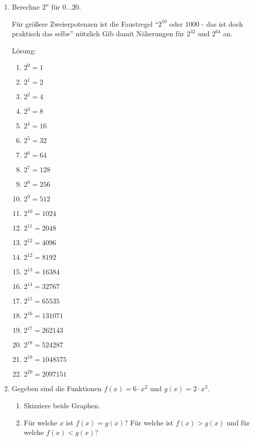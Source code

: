 \documentclass[../main.tex]{subfiles}
\begin{document}
\begin{enumerate}
	\item Berechne \( 2^n \) für \( 0 \dots 20 \).

	      Für größere Zweierpotenzen ist die Faustregel "`\( 2^{10} \) oder \( 1000 \) - das ist doch praktisch das selbe"'
	      nützlich Gib damit Näherungen für \( 2^{32} \) und \( 2^{64} \) an.

	      Lösung:
	      \begin{multicols}{3}
		      \begin{enumerate}
			      \item \( 2^0 = 1 \)
			      \item \( 2^1 = 2 \)
			      \item \( 2^2 = 4 \)
			      \item \( 2^3 = 8 \)
			      \item \( 2^4 = 16 \)
			      \item \( 2^5 = 32 \)
			      \item \( 2^6 = 64 \)
			      \item \( 2^7 = 128 \)
			      \item \( 2^8 =  256 \)
			      \item \( 2^9 = 512 \)
			      \item \( 2^{10} = 1024 \)
			      \item \( 2^{11} = 2048 \)
			      \item \( 2^{12} = 4096 \)
			      \item \( 2^{12} = 8192 \)
			      \item \( 2^{13} = 16384 \)
			      \item \( 2^{14} = 32767 \)
			      \item \( 2^{15} = 65535 \)
			      \item \( 2^{16} = 131071 \)
			      \item \( 2^{17} = 262143 \)
			      \item \( 2^{18} = 524287 \)
			      \item \( 2^{19} = 1 048 575 \)
			      \item \( 2^{20} = 2 097 151 \)
		      \end{enumerate}
	      \end{multicols}
	\item Gegeben sind die Funktionen \( f(x) = 6 \cdot x^2 \) und \( g(x) = 2 \cdot x^3 \).
	      \begin{enumerate}
		      \item Skizziere beide Graphen.
		      \item Für welche \( x \) ist \( f(x) = g(x) \)?
		            Für welche ist \( f(x) > g(x) \) und für welche \( f(x) < g(x) \)?
	      \end{enumerate}


\end{enumerate}
\end{document}
